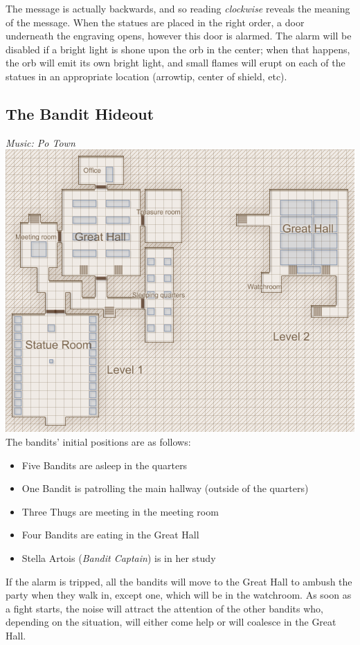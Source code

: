 The message is actually backwards, and so reading \textit{clockwise} reveals the meaning of the message. When the statues are placed in the right order, a door underneath the engraving opens, however this door is alarmed. The alarm will be disabled if a bright light is shone upon the orb in the center; when that happens, the orb will emit its own bright light, and small flames will erupt on each of the statues in an appropriate location (arrowtip, center of shield, etc).

\subsection{The Bandit Hideout}
\textit{Music: Po Town}\\
\includegraphics[scale=0.5]{combats/banditcave.PNG}\\
The bandits' initial positions are as follows:
\begin{itemize}
\item Five Bandits are asleep in the quarters
\item One Bandit is patrolling the main hallway (outside of the quarters)
\item Three Thugs are meeting in the meeting room
\item Four Bandits are eating in the Great Hall
\item Stella Artois (\textit{Bandit Captain}) is in her study
\end{itemize}
If the alarm is tripped, all the bandits will move to the Great Hall to ambush the party when they walk in, except one, which will be in the watchroom. As soon as a fight starts, the noise will attract the attention of the other bandits who, depending on the situation, will either come help or will coalesce in the Great Hall.\\
